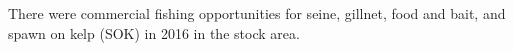 There were commercial fishing opportunities for seine, gillnet, food and bait, and spawn on kelp (SOK) in 2016 in the \regionName{} \regionType{} stock area.